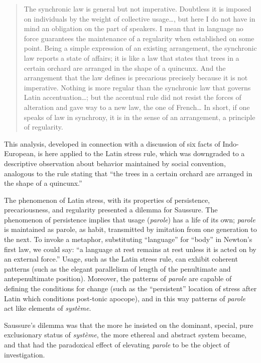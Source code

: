 \documentclass[output=paper,
modfonts
]{LSP/langsci}
\begin{document}
\begin{quote}
The synchronic law is general but not imperative. Doubtless it is
imposed on individuals by the weight of collective usage\ldots{}, but
here I do not have in mind an obligation on the part of speakers. I mean
that in language no force guarantees the maintenance of a regularity
when established on some point. Being a simple expression of an existing
arrangement, the synchronic law reports a state of affairs; it is like a
law that states that trees in a certain orchard are arranged in the
shape of a quincunx. And the arrangement that the law defines is
precarious precisely because it is not imperative. Nothing is more
regular than the synchronic law that governs Latin accentuation\ldots{};
but the accentual rule did not resist the forces of alteration and gave
way to a new law, the one of French\ldots{} In short, if one speaks of
law in synchrony, it is in the sense of an arrangement, a principle of
regularity. \citep[92--93]{DESb}
\end{quote}

This analysis, developed in connection with a discussion of six facts of
Indo-European, is here applied to the Latin stress rule, which was
downgraded to a descriptive observation about behavior maintained by
social convention, analogous to the rule stating that ``the trees in a
certain orchard are arranged in the shape of a quincunx.''

The phenomenon of Latin stress, with its properties of persistence,
precariousness, and regularity presented a dilemma for Saussure. The
phenomenon of persistence implies that usage (\emph{parole}) has a life
of its own; \emph{parole} is maintained as parole, as habit, transmitted
by imitation from one generation to the next. To invoke a metaphor,
substituting ``language'' for ``body'' in Newton's first law, we could
say: ``a language at rest remains at rest unless it is acted on by an
external force.'' Usage, such as the Latin stress rule, can exhibit
coherent patterns (such as the elegant parallelism of length of the
penultimate and antepenultimate position). Moreover, the patterns of
\emph{parole} are capable of defining the conditions for change (such as
the ``persistent'' location of stress after Latin which conditions
post-tonic apocope), and in this way patterns of \emph{parole} act like
elements of \emph{système}.

Saussure's dilemma was that the more he insisted on the dominant,
special, pure exclusionary status of \emph{système}, the more ethereal
and abstract system became, and that had the paradoxical effect of
elevating \emph{parole} to be the object of investigation.
\end{document}
